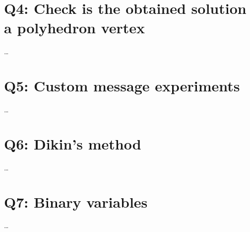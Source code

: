 \documentclass{article}
\begin{document}
\section{Q4: Check is the obtained solution a polyhedron vertex}
\ldots

\section{Q5: Custom message experiments}
\ldots

\section{Q6: Dikin's method}
\ldots

\section{Q7: Binary variables}
\ldots
\end{document}
